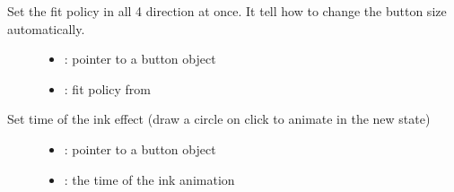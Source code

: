 \documentclass[letterpaper,10pt,english]{sphinxmanual}
\begin{document}
\begin{fulllineitems}
\label{\detokenize{object-types/btn:_CPPv414lv_btn_set_fitP8lv_obj_t8lv_fit_t}}%
\pysigstartmultiline
{}\label{\detokenize{object-types/btn:lv__btn_8h_1a42a1a0ecefdd3d2d7e7f800a4bc6fabb}}%
\pysigstopmultiline
Set the fit policy in all 4 direction at once. It tell how to change the button size automatically. \begin{description}
\item[{}] \leavevmode\begin{itemize}
\item {} 
: pointer to a button object 

\item {} 
: fit policy from  

\end{itemize}

\end{description}


\end{fulllineitems}


\begin{fulllineitems}
\label{\detokenize{object-types/btn:_CPPv422lv_btn_set_ink_in_timeP8lv_obj_t8uint16_t}}%
\pysigstartmultiline
{}\label{\detokenize{object-types/btn:lv__btn_8h_1af7fa2f49940727aa0bb03d667071756f}}%
\pysigstopmultiline
Set time of the ink effect (draw a circle on click to animate in the new state) \begin{description}
\item[{}] \leavevmode\begin{itemize}
\item {} 
: pointer to a button object 

\item {} 
: the time of the ink animation 

\end{itemize}

\end{description}


\end{fulllineitems}
\end{document}
